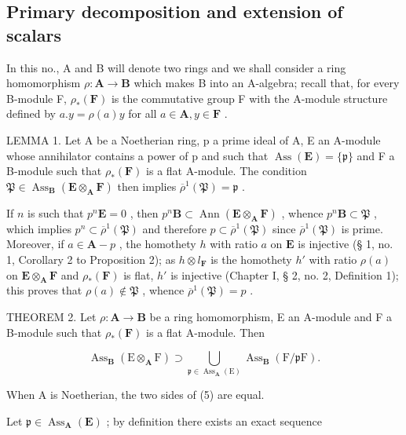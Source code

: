 \subsection{Primary decomposition and extension of scalars}

In this no., A and B will denote two rings and we shall consider a ring homomorphism \(\rho: \mathbf{A} \to \mathbf{B}\) which makes B into an A-algebra; recall that, for every B-module F, \(\rho_*(\mathbf{F})\) is the commutative group F with the A-module structure defined by \(a.y = \rho(a)y\) for all \(a \in \mathbf{A}, y \in \mathbf{F}\) .

LEMMA 1. Let A be a Noetherian ring, p a prime ideal of A, E an A-module whose annihilator contains a power of p and such that \(\operatorname{Ass}(\mathbf{E}) = \{\mathfrak{p}\}\) and F a B-module such that \(\rho_{*}(\mathbf{F})\) is a flat A-module. The condition \(\mathfrak{P} \in \operatorname{Ass}_{\mathbf{B}}(\mathbf{E} \otimes_{\mathbf{A}} \mathbf{F})\) then implies \(\overline{\rho}^{1}(\mathfrak{P}) = \mathfrak{p}\) .

If \(n\) is such that \(p^n\mathbf{E} = 0\) , then \(p^n\mathbf{B} \subset \operatorname{Ann}(\mathbf{E} \otimes_{\mathbf{A}} \mathbf{F})\) , whence \(p^n\mathbf{B} \subset \mathfrak{P}\) , which implies \(p^n \subset \overline{\rho}^1(\mathfrak{P})\) and therefore \(p \subset \overline{\rho}^1(\mathfrak{P})\) since \(\overline{\rho}^1(\mathfrak{P})\) is prime. Moreover, if \(a \in \mathbf{A} - p\) , the homothety \(h\) with ratio \(a\) on \(\mathbf{E}\) is injective (§ 1, no. 1, Corollary 2 to Proposition 2); as \(h \otimes l_{\mathbf{F}}\) is the homothety \(h'\) with ratio \(\rho(a)\) on \(\mathbf{E} \otimes_{\mathbf{A}} \mathbf{F}\) and \(\rho_*(\mathbf{F})\) is flat, \(h'\) is injective (Chapter I, § 2, no. 2, Definition 1); this proves that \(\rho(a) \notin \mathfrak{P}\) , whence \(\overline{\rho}^1(\mathfrak{P}) = p\) .

THEOREM 2. Let \(\rho: \mathbf{A} \to \mathbf{B}\) be a ring homomorphism, E an A-module and F a B-module such that \(\rho_*(\mathbf{F})\) is a flat A-module. Then

\[
\operatorname{Ass} _ {\mathbf {B}} (\mathrm{E} \otimes_ {\mathbf {A}} \mathrm{F}) \supset \bigcup_ {\mathfrak {p} \in \operatorname{Ass} _ {\mathbf {A}} (\mathrm{E})} \operatorname{Ass} _ {\mathbf {B}} (\mathrm{F} / \mathfrak {p} \mathrm{F}).\tag{5}
\]

When A is Noetherian, the two sides of (5) are equal.

Let \(\mathfrak{p} \in \operatorname{Ass}_{\mathbf{A}}(\mathbf{E})\) ; by definition there exists an exact sequence

